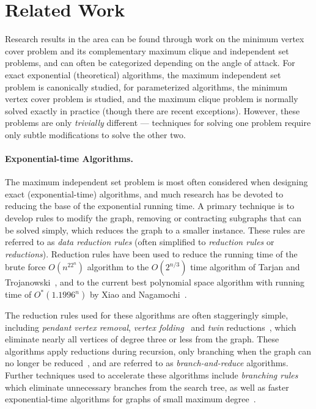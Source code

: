 \documentclass[twoside,leqno,twocolumn]{article}
\begin{document}
\section{Related Work}
\label{sec:related_work}
Research results in the area can be found through work on the minimum vertex cover problem and its complementary maximum clique and independent set problems, and can often be categorized depending on the angle of attack. For exact exponential (theoretical) algorithms, the maximum independent set problem is canonically studied, for parameterized algorithms, the minimum vertex cover problem is studied, and the maximum clique problem is normally solved exactly in practice (though there are recent exceptions). However, these problems are only \emph{trivially} different --- techniques for solving one problem require only subtle modifications to solve the other two.

\paragraph*{Exponential-time Algorithms.}
The maximum independent set problem is most often considered when designing exact (exponential-time) algorithms, and much research has be devoted to reducing the base of the exponential running time. A primary technique is  to develop rules to modify the graph, removing or contracting subgraphs that can be solved simply, which reduces the graph to a smaller instance. These rules are referred to as \emph{data reduction rules} (often simplified to \emph{reduction rules} or \emph{reductions}).
Reduction rules have been used to reduce the running time of the brute force $O(n^22^n)$ algorithm to the $O(2^{n/3})$ time algorithm of Tarjan and Trojanowski~\cite{tarjan-1977}, and to the current best polynomial space algorithm with running time of $O^*(1.1996^n)$ by Xiao and Nagamochi~\cite{xiao2017exact}. 

The reduction rules used for these algorithms are often staggeringly simple, including \emph{pendant vertex removal}, \emph{vertex folding}~\cite{chen1999} and \emph{twin} reductions~\cite{Xiao201392}, which eliminate nearly all vertices of degree three or less from the graph. 
These algorithms apply reductions during recursion, only branching when the graph can no longer be reduced~\cite{fomin-2010}, and are referred to as \emph{branch-and-reduce} algorithms. Further techniques used to accelerate these algorithms include \emph{branching rules}~\cite{kneis2009fine,fomin2009measure} which eliminate unnecessary branches from the search tree, as well as faster exponential-time algorithms for graphs of small maximum degree~\cite{xiao2017exact}.
\end{document}
